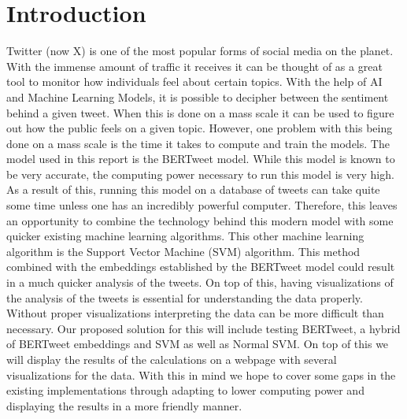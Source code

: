 \documentclass[conference]{IEEEtran}
\begin{document}
\section{Introduction}
Twitter (now X) is one of the most popular forms of social media on the planet.
With the immense amount of traffic it receives it can be thought of as a great tool to monitor how individuals feel about certain topics.
With the help of AI and Machine Learning Models, it is possible to decipher between the sentiment behind a given tweet.
When this is done on a mass scale it can be used to figure out how the public feels on a given topic.
However, one problem with this being done on a mass scale is the time it takes to compute and train the models.
The model used in this report is the BERTweet model.
While this model is known to be very accurate, the computing power necessary to run this model is very high.
As a result of this, running this model on a database of tweets can take quite some time unless one has an incredibly powerful computer.
Therefore, this leaves an opportunity to combine the technology behind this modern model with some quicker existing machine learning algorithms.
This other machine learning algorithm is the Support Vector Machine (SVM) algorithm.
This method combined with the embeddings established by the BERTweet model could result in a much quicker analysis of the tweets.
On top of this, having visualizations of the analysis of the tweets is essential for understanding the data properly.
Without proper visualizations interpreting the data can be more difficult than necessary. 
Our proposed solution for this will include testing BERTweet, a hybrid of BERTweet embeddings and SVM as well as Normal SVM. 
On top of this we will display the results of the calculations on a webpage with several visualizations for the data. 
With this in mind we hope to cover some gaps in the existing implementations through adapting to lower computing power and displaying the results in a more friendly manner. 
\end{document}
